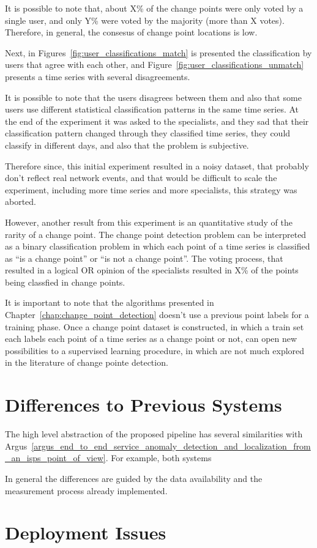 It is possible to note that, about X\% of the change points were only voted by
a single user, and only Y\% were voted by the majority (more than X votes).
Therefore, in general,
the consesus of change point locations is low.

Next, in Figures~\ref{fig:user_classifications_match} is presented the
classification by users that agree with each other, and
Figure~\ref{fig:user_classifications_unmatch} presents a time series with
several disagreements.

It is possible to note that the users disagrees between them and also that some
users use different statistical classification patterns in the same time
series. At the end of the experiment it was asked to the specialists, and they
sad that their classification pattern changed through they classified time
series, they could classify in different days, and also that the problem is
subjective.

Therefore since, this initial experiment resulted in a noisy dataset, that
probably don't reflect real network events, and that
would be difficult to scale the experiment, including more time series and more
specialists, this strategy was aborted.

However, another result from this experiment is an quantitative study of the
rarity of a
change point. The change point detection problem can be interpreted as a binary
classification problem in which each point of a time series is classified as
``is a change point'' or ``is not a change point''. The voting process, that
resulted in a logical OR opinion of the specialists resulted in X\% of the
points being classfied in change points.

It is important to note that the algorithms presented in
Chapter~\ref{chap:change_point_detection} doesn't use a previous point labels
for a training phase. Once a change point dataset is constructed, in which a
train set each labels each point of a time series as a change point or not, can
open new possibilities to a supervised learning procedure, in which are not
much explored in the literature of change pointe detection.

\section{Differences to Previous Systems}

The high level abstraction of the proposed pipeline has several similarities
with
Argus~\ref{argus_end_to_end_service_anomaly_detection_and_localization_from_an_isps_point_of_view}.
For example, both systems

In general the differences are guided by the data availability and the
measurement process already implemented.

\section{Deployment Issues}
